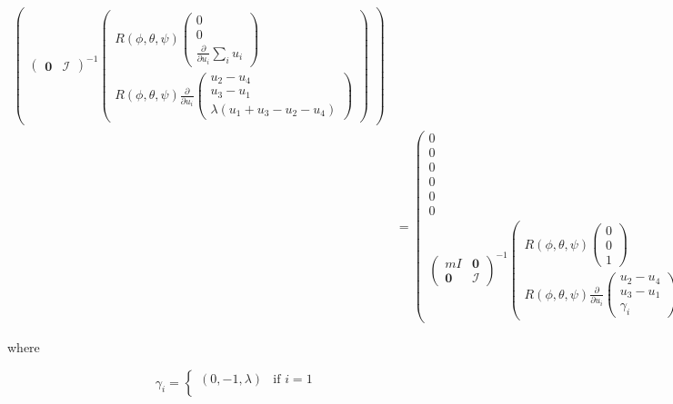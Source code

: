\documentclass{article}
\begin{document}
\begin{equation}
\begin{aligned}
\begin{pmatrix}
\begin{pmatrix}
            \mathbf{0} & \mathcal{I}
        \end{pmatrix}^{-1}
        \begin{pmatrix}
            R(\phi, \theta, \psi) \begin{pmatrix} 
                0 \\ 
                0 \\ 
                \frac{\partial}{\partial u_i} \sum_{i} u_i
            \end{pmatrix} \\
            R(\phi, \theta, \psi) \frac{\partial}{\partial u_i} \begin{pmatrix}
                u_2 - u_4 \\ 
                u_3 - u_1 \\ 
                \lambda(u_1 + u_3 - u_2 - u_4) 
            \end{pmatrix}
        \end{pmatrix}
    \end{pmatrix} \\
    &= \begin{pmatrix}
        0 \\
        0 \\
        0 \\
        0 \\
        0 \\
        0 \\
        \begin{pmatrix}
            m I & \mathbf{0} \\
            \mathbf{0} & \mathcal{I}
        \end{pmatrix}^{-1}
        \begin{pmatrix}
            R(\phi, \theta, \psi) \begin{pmatrix} 
                0 \\ 
                0 \\ 
                1
            \end{pmatrix} \\
            R(\phi, \theta, \psi) \frac{\partial}{\partial u_i} \begin{pmatrix}
                u_2 - u_4 \\ 
                u_3 - u_1 \\ 
                \gamma_i
            \end{pmatrix}
        \end{pmatrix}
    \end{pmatrix}
\end{aligned}
\end{equation}

where 

\begin{equation}
    \gamma_i = \begin{cases}
        (0, -1, \lambda) & \text{if } i = 1 \\
        
    \end{cases}
\end{equation}
\end{document}
